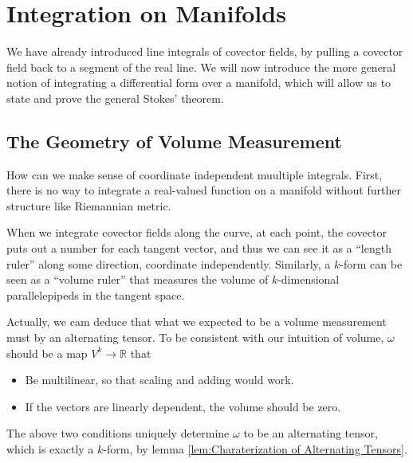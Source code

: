 \documentclass[../main.tex]{subfiles}
\begin{document}
\chapter{Integration on Manifolds}\label{ch:Integration}

We have already introduced line integrals of covector fields, by pulling a covector field back to a segment of the real line. We will now introduce the more general notion of integrating a differential form over a manifold, which will allow us to state and prove the general Stokes' theorem.

\section{The Geometry of Volume Measurement}
How can we make sense of coordinate independent muultiple integrals. First, there is no way to integrate a real-valued function on a manifold without further structure like Riemannian metric.

When we integrate covector fields along the curve, at each point, the covector puts out a number for each tangent vector, and thus we can see it as a ``length ruler'' along some direction, coordinate independently. Similarly, a $k$-form can be seen as a ``volume ruler'' that measures the volume of $k$-dimensional parallelepipeds in the tangent space.

Actually, we cam deduce that what we expected to be a volume measurement must by an alternating tensor. To be consistent with our intuition of volume, $\omega$ should be a map $V^k\to \mathbb{R}$ that
\begin{itemize}
  \item Be multilinear, so that scaling and adding would work.
  \item If the vectors are linearly dependent, the volume should be zero.
\end{itemize}
The above two conditions uniquely determine $\omega$ to be an alternating tensor, which is exactly a $k$-form, by lemma \ref{lem:Charaterization of Alternating Tensors}.
\end{document}
